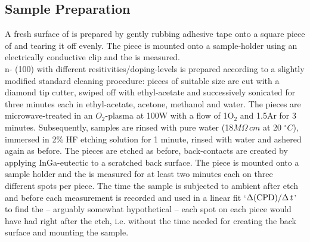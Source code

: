 \subsection{Sample Preparation}
A fresh surface of \hopg{} is prepared by gently rubbing adhesive tape onto a square piece of \hopg{} and tearing it off evenly. The piece is mounted onto a sample-holder using an electrically conductive clip and the \cpd{} is measured.\\
n-\sih{} (100) with different resitivities/doping-levels is prepared according to a slightly modified standard cleaning procedure: pieces of suitable size are cut with a diamond tip cutter, swiped off with ethyl-acetate and successively sonicated for three minutes each in ethyl-acetate, acetone, methanol and water. The pieces are microwave-treated in an $O_2$-plasma at 100W with a flow of 1\litmin O$_2$ and 1.5\litmin Ar for 3 minutes. Subsequently, samples are rinsed with pure water (18$M\Omega \, cm$ at 20 $^{\circ}C$), immersed in 2\% HF etching solution for 1 minute, rinsed with water and ashered again as before. The pieces are etched as before, back-contacts are created by applying InGa-eutectic to a scratched back surface. The piece is mounted onto a sample holder and the \cpd{} is measured for at least two minutes each on three different spots per piece. The time the sample is subjected to ambient after etch and before each measurement is recorded and used in a linear fit \lq{}$\Delta (\text{CPD}{})/\Delta \, t$\rq{} to find the -- arguably somewhat hypothetical -- \cpd{} each spot on each piece would have had right after the etch, i.e. without the time needed for creating the back surface and mounting the sample.\\
